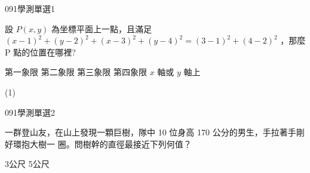 \begin{QUESTIONS}
    \begin{QUESTION}
        \begin{ExamInfo}{091}{學測}{單選}{1}
        \end{ExamInfo}
        \begin{ExamAnsRateInfo}{76}{97}{83}{48}
        \end{ExamAnsRateInfo}
        \begin{QBODY}
            設 $P(x,y)$ 為坐標平面上一點，且滿足
            $(x-1)^2 +(y-2)^2 + (x-3)^2 +(y-4)^2 = (3-1)^2 +(4-2)^2$
            ，那麼 P 點的位置在哪裡?
            
            \begin{QOPS} 
                \QOP 第一象限 
                \QOP 第二象限 
                \QOP 第三象限 
                \QOP 第四象限 
                \QOP $x$ 軸或 $y$ 軸上
            \end{QOPS}
        \end{QBODY}
        \begin{QFROMS}
        \end{QFROMS}
        \begin{QTAGS}\end{QTAGS}
        \begin{QANS}
            (1)
        \end{QANS}
        \begin{QSOLLIST}
        \end{QSOLLIST}
        \begin{QEMPTYSPACE}
        \end{QEMPTYSPACE}
    \end{QUESTION}
    \begin{QUESTION}
        \begin{ExamInfo}{091}{學測}{單選}{2}
        \end{ExamInfo}
        \begin{ExamAnsRateInfo}{51}{79}{51}{23}
        \end{ExamAnsRateInfo}
        \begin{QBODY}
            一群登山友，在山上發現一顆巨樹，隊中 10 位身高 170 公分的男生，手拉著手剛好環抱大樹一 圈。問樹幹的直徑最接近下列何值？ 
            \begin{QOPS} 
                \QOP 3公尺 
                \QOP 5公尺
                

\end{QOPS}
\end{QBODY}
\end{QUESTION}
\end{QUESTIONS}
